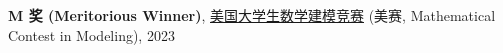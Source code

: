 \textbf{M 奖 (Meritorious Winner)}, \href{https://www.contest.comap.com/undergraduate/contests/mcm/contests/2023/results/}{美国大学生数学建模竞赛} (美赛, Mathematical Contest in Modeling), 2023
